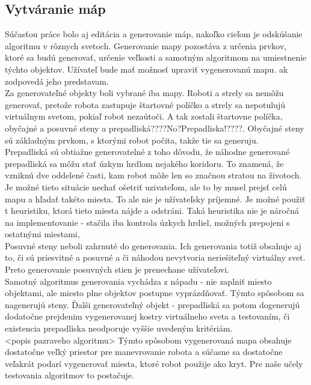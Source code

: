 \subsection{Vytváranie máp}
Súčasťou práce bolo aj editácia a generovanie máp, nakoľko cieľom je odskúšanie algoritmu v rôznych svetoch.
Generovanie mapy pozostáva z určenia prvkov, ktoré sa budú generovať, určenie veľkosti a samotným algoritmom na umiestnenie týchto objektov. Užívateľ bude mať možnosť upraviť vygenerovanú mapu.  ak  zodpovedá  jeho predstavam.\\
Za generovateľné objekty boli vybrané  iba mapy. Roboti a strely sa nemôžu generovať, pretože robota zastupuje štartovné políčko a strely sa nepotulujú virtuálnym svetom, pokiaľ robot nezaútoči. A tak zostali štartovne políčka, obyčajné a posuvné  steny a prepadliská????No?Prepadliska!????. Obyčajné steny sú základným prvkom, s ktorými robot počita, takže tie sa generuju. \\
Prepadliská sú obtiažne generovatelné z toho dôvodu, že náhodne generované prepadliská sa môžu stať úzkym hrdlom nejakého koridoru. To znamená, že vzniknú dve oddelené časti, kam robot môže len so značnou stratou na životoch. Je možné tieto situácie nechať ošetriť uzivateľom, ale to by musel prejsť celú mapu a hľadať takéto miesta. To ale nie je užívateľsky príjemné. Je možné použiť t heuristiku, ktorá tieto miesta nájde a odstráni. Taká heuristika nie je náročná na implementovanie - stačila iba kontrola úzkych hrdiel, možných prepojeni s ostatnými miestami,\\ %
Posuvné steny neboli zahrnuté do generovania. Ich generovania totiž obsahuje aj to, či sú priesvitné a posuvné a či náhodou nevytvoria  neriešiteľný virtuálny svet. Preto generovanie posuvných stien je prenechane užívateľovi.\\
Samotný algoritmus generovania vychádza z nápadu - nie zaplniť miesto objektami, ale miesto plne objektov postupne vyprázdňovať. Týmto spôsobom sa nagenerujú steny. Ďalši generovateľný objekt - prepadliská sa potom dogenerujú dodatočne prejdenim vygenerovanej kostry virtuálneho sveta a testovaním, či existencia prepadliska neodporuje vyššie  uvedeným kritériám.\\
<popis pazraveho algoritmu> %
Týmto spôsobom vygenerovaná mapa obsahuje dostatočne veľký priestor pre manevrovanie robota a súčasne sa dostatočne veľakrát podarí vygenerovať  miesta, ktoré robot použije ako kryt. Pre naše učely testovania algoritmov to postačuje. %


